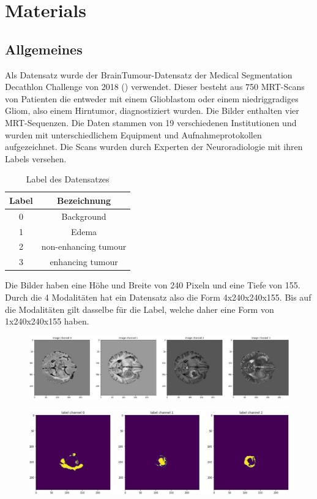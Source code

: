 \chapter{Materials}
\section{Allgemeines}
Als Datensatz wurde der BrainTumour-Datensatz der Medical Segmentation Decathlon Challenge von 2018 (\cite{Antonelli.2021}) verwendet. Dieser besteht aus 750 MRT-Scans von Patienten die entweder mit einem Glioblastom oder einem niedriggradiges Gliom, also einem Hirntumor, diagnostiziert wurden. Die Bilder enthalten vier MRT-Sequenzen. Die Daten stammen von 19 verschiedenen Institutionen und wurden mit unterschiedlichem Equipment und Aufnahmeprotokollen aufgezeichnet. Die Scans wurden durch Experten der Neuroradiologie mit ihren Labels versehen.

\begin{table}[H]
\center
\begin{tabular}{|c|c|}
\hline 
Label & Bezeichnung \\ 
\hline 
0 & Background \\ 
\hline 
1 & Edema  \\ 
\hline 
2 & non-enhancing tumour \\ 
\hline 
3 & enhancing tumour \\ 
\hline 

\end{tabular} 
\caption {Label des Datensatzes}
\end{table}

Die Bilder haben eine Höhe und Breite von 240 Pixeln und eine Tiefe von 155. Durch die 4 Modalitäten hat ein Datensatz also die Form 4x240x240x155. Bis auf die Modalitäten gilt dasselbe für die Label, welche daher eine Form von 1x240x240x155 haben.

\begin{figure}[H]
\includegraphics[width=\linewidth]{./images/DatenImg.jpg}
\end{figure}

\begin{figure}[H]
\includegraphics[width=\linewidth]{./images/DatenLabel.jpg}
\end{figure}

